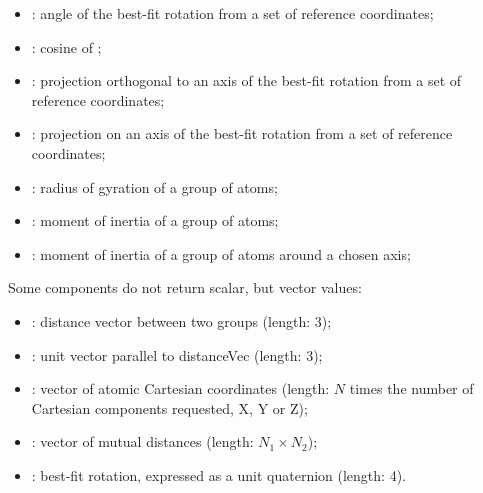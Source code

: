 \begin{itemize}
\item {}: angle of the best-fit rotation from
  a set of reference coordinates;
\item {}: cosine of ;
\item {}: projection orthogonal to an axis of the best-fit rotation
  from a set of reference coordinates;
\item {}: projection on an axis of the best-fit rotation
  from a set of reference coordinates;
\item {}: radius of gyration of a group of atoms;
\item {}: moment of inertia of a group of atoms;
\item {}: moment of inertia of a group of atoms around a chosen axis;
\end{itemize}

Some components do not return scalar, but vector values:
\begin{itemize}
\item {}: distance vector between two groups (length: 3);
\item {}: unit vector parallel to distanceVec (length: 3);
\item {}: vector of atomic Cartesian coordinates (length: $N$ times the number of Cartesian components requested, X, Y or Z);
\item {}: vector of mutual distances (length: $N_{\mathrm{1}}\times{}N_{\mathrm{2}}$);
\item {}: best-fit rotation, expressed as a unit quaternion (length: 4).
\end{itemize}

